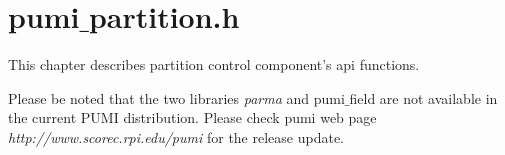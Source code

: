 \section{pumi$\_$partition.h}

This chapter describes partition control component's api functions.

Please be noted that the two libraries \emph{parma} and {pumi$\_$field} are not available in the current PUMI distribution. Please check pumi web page \textit{http://www.scorec.rpi.edu/pumi} for the release update.


